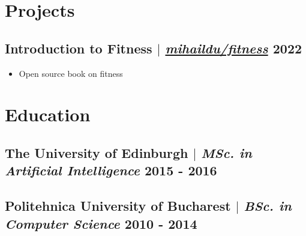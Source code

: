 \documentclass[11pt]{article} %
\begin{document}
\section{Projects}
\subsection{Introduction to Fitness $|$ \normalfont\textit{\href{https://github.com/mihaildu/fitness}{mihaildu/fitness}} \hfill 2022}
\begin{itemize}
  \item Open source book on fitness
\end{itemize}

\section{Education}
\subsection{The University of Edinburgh $|$ {\normalfont\itshape MSc. in Artificial Intelligence} \hfill 2015 - 2016}
\subsection{Politehnica University of Bucharest $|$ {\normalfont\itshape BSc. in Computer Science} \hfill 2010 - 2014}
\end{document}
